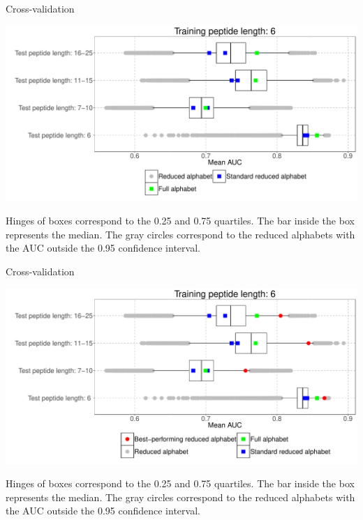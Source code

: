 \documentclass{beamer}\usepackage[]{graphicx}\usepackage[]{color}
\makeatletter
\def\maxwidth{ %
  \ifdim\Gin@nat@width>\linewidth
    \linewidth
  \else
    \Gin@nat@width
  \fi
}
\newenvironment{knitrout}{}{} %
\makeatother
\begin{document}
\begin{frame}{Cross-validation}
\begin{knitrout}
\color{fgcolor}

{\centering \includegraphics[width=\maxwidth]{figure/unnamed-chunk-3-1} 

}



\end{knitrout}
  \tiny
Hinges of boxes correspond to 
the 0.25 and 0.75 quartiles. The bar inside the box represents the median. The 
gray circles correspond to the reduced alphabets with the AUC outside the 0.95 
confidence interval.

  
  \end{frame}

  
    \begin{frame}{Cross-validation}
\begin{knitrout}
\color{fgcolor}

{\centering \includegraphics[width=\maxwidth]{figure/unnamed-chunk-4-1} 

}



\end{knitrout}
  
  \tiny
Hinges of boxes correspond to 
the 0.25 and 0.75 quartiles. The bar inside the box represents the median. The 
gray circles correspond to the reduced alphabets with the AUC outside the 0.95 
confidence interval.

  
  \end{frame}
  
\end{document}
